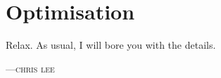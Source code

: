 %
%

\chapter{Optimisation}
\epigraph{Relax. As usual, I will bore you with the details.}%
{\textsc{---chris lee}}

% 
% 
% 
% 
